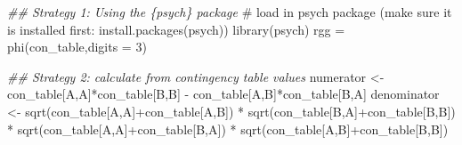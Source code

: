 \documentclass[
  letterpaper,
  DIV=11,
  numbers=noendperiod]{scrreprt}
\newenvironment{Shaded}{\begin{snugshade}}{\end{snugshade}}
\newcommand{\AttributeTok}[1]{\textcolor[rgb]{0.40,0.45,0.13}{#1}}
\newcommand{\CommentTok}[1]{\textcolor[rgb]{0.37,0.37,0.37}{#1}}
\newcommand{\DecValTok}[1]{\textcolor[rgb]{0.68,0.00,0.00}{#1}}
\newcommand{\DocumentationTok}[1]{\textcolor[rgb]{0.37,0.37,0.37}{\textit{#1}}}
\newcommand{\FunctionTok}[1]{\textcolor[rgb]{0.28,0.35,0.67}{#1}}
\newcommand{\NormalTok}[1]{\textcolor[rgb]{0.00,0.23,0.31}{#1}}
\newcommand{\OtherTok}[1]{\textcolor[rgb]{0.00,0.23,0.31}{#1}}
\newcommand{\SpecialCharTok}[1]{\textcolor[rgb]{0.37,0.37,0.37}{#1}}
\newcommand{\StringTok}[1]{\textcolor[rgb]{0.13,0.47,0.30}{#1}}
\begin{document}
\begin{Shaded}
\begin{Highlighting}[]
\DocumentationTok{\#\# Strategy 1: Using the \{psych\} package}
\CommentTok{\# load in psych package (make sure it is installed first: install.packages(\textquotesingle{}psych\textquotesingle{}))}
\FunctionTok{library}\NormalTok{(psych)}
\NormalTok{rgg }\OtherTok{=} \FunctionTok{phi}\NormalTok{(con\_table,}\AttributeTok{digits =} \DecValTok{3}\NormalTok{)}

\DocumentationTok{\#\# Strategy 2: calculate from contingency table values}
\NormalTok{numerator }\OtherTok{\textless{}{-}}\NormalTok{ con\_table[}\StringTok{\textquotesingle{}A\textquotesingle{}}\NormalTok{,}\StringTok{\textquotesingle{}A\textquotesingle{}}\NormalTok{]}\SpecialCharTok{*}\NormalTok{con\_table[}\StringTok{\textquotesingle{}B\textquotesingle{}}\NormalTok{,}\StringTok{\textquotesingle{}B\textquotesingle{}}\NormalTok{] }\SpecialCharTok{{-}}\NormalTok{ con\_table[}\StringTok{\textquotesingle{}A\textquotesingle{}}\NormalTok{,}\StringTok{\textquotesingle{}B\textquotesingle{}}\NormalTok{]}\SpecialCharTok{*}\NormalTok{con\_table[}\StringTok{\textquotesingle{}B\textquotesingle{}}\NormalTok{,}\StringTok{\textquotesingle{}A\textquotesingle{}}\NormalTok{]}
\NormalTok{denominator }\OtherTok{\textless{}{-}} \FunctionTok{sqrt}\NormalTok{(con\_table[}\StringTok{\textquotesingle{}A\textquotesingle{}}\NormalTok{,}\StringTok{\textquotesingle{}A\textquotesingle{}}\NormalTok{]}\SpecialCharTok{+}\NormalTok{con\_table[}\StringTok{\textquotesingle{}A\textquotesingle{}}\NormalTok{,}\StringTok{\textquotesingle{}B\textquotesingle{}}\NormalTok{]) }\SpecialCharTok{*}
               \FunctionTok{sqrt}\NormalTok{(con\_table[}\StringTok{\textquotesingle{}B\textquotesingle{}}\NormalTok{,}\StringTok{\textquotesingle{}A\textquotesingle{}}\NormalTok{]}\SpecialCharTok{+}\NormalTok{con\_table[}\StringTok{\textquotesingle{}B\textquotesingle{}}\NormalTok{,}\StringTok{\textquotesingle{}B\textquotesingle{}}\NormalTok{]) }\SpecialCharTok{*} 
               \FunctionTok{sqrt}\NormalTok{(con\_table[}\StringTok{\textquotesingle{}A\textquotesingle{}}\NormalTok{,}\StringTok{\textquotesingle{}A\textquotesingle{}}\NormalTok{]}\SpecialCharTok{+}\NormalTok{con\_table[}\StringTok{\textquotesingle{}B\textquotesingle{}}\NormalTok{,}\StringTok{\textquotesingle{}A\textquotesingle{}}\NormalTok{]) }\SpecialCharTok{*} 
               \FunctionTok{sqrt}\NormalTok{(con\_table[}\StringTok{\textquotesingle{}A\textquotesingle{}}\NormalTok{,}\StringTok{\textquotesingle{}B\textquotesingle{}}\NormalTok{]}\SpecialCharTok{+}\NormalTok{con\_table[}\StringTok{\textquotesingle{}B\textquotesingle{}}\NormalTok{,}\StringTok{\textquotesingle{}B\textquotesingle{}}\NormalTok{])}


\end{Highlighting}
\end{Shaded}
\end{document}
